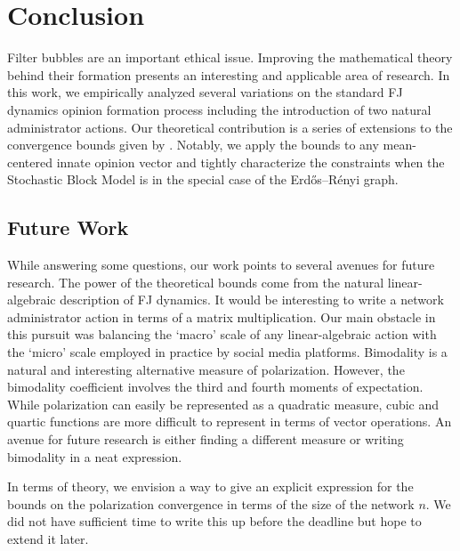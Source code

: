 
\section{Conclusion}\label{sec:conclusion}
Filter bubbles are an important ethical issue.
Improving the mathematical theory behind their formation
presents an interesting and applicable area of research.
In this work, we empirically analyzed several
variations on the standard FJ dynamics opinion formation process
including the introduction of two natural
administrator actions.
Our theoretical contribution is a series of extensions
to the convergence bounds given by \cite{chitra20analyzing}.
Notably, we apply the bounds to any mean-centered
innate opinion vector and tightly characterize the
constraints when the Stochastic Block Model is in
the special case of the Erdős–Rényi graph.

\subsection{Future Work}

While answering some questions, our work points to several
avenues for future research.
The power of the theoretical bounds come from the natural
linear-algebraic description of FJ dynamics.
It would be interesting to write a network
administrator action in terms of a matrix multiplication.
Our main obstacle in this pursuit was balancing the
`macro' scale of any linear-algebraic action with
the `micro' scale employed in practice by social media platforms.
Bimodality is a natural and interesting alternative
measure of polarization.
However, the bimodality coefficient involves the third and fourth moments
of expectation.
While polarization can easily be represented as a quadratic measure,
cubic and quartic functions are more difficult to represent
in terms of vector operations.
An avenue for future research is either finding a
different measure or writing bimodality in a neat expression.

In terms of theory, we envision a way to give an explicit
expression for the bounds on the polarization convergence
in terms of the size of the network $n$.
We did not have sufficient time to write this up before
the deadline but hope to extend it later.

